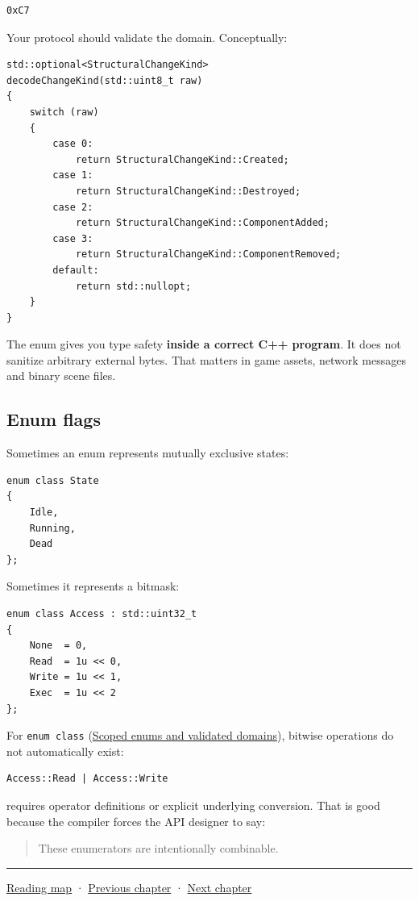\begin{verbatim}
0xC7
\end{verbatim}

Your protocol should validate the domain. Conceptually:

\begin{verbatim}
std::optional<StructuralChangeKind>
decodeChangeKind(std::uint8_t raw)
{
    switch (raw)
    {
        case 0:
            return StructuralChangeKind::Created;
        case 1:
            return StructuralChangeKind::Destroyed;
        case 2:
            return StructuralChangeKind::ComponentAdded;
        case 3:
            return StructuralChangeKind::ComponentRemoved;
        default:
            return std::nullopt;
    }
}
\end{verbatim}

The enum gives you type safety \textbf{inside a correct C++ program}. It does not sanitize arbitrary external bytes. That matters in game assets, network messages and binary scene files.

\subsection{Enum flags}\label{01-foundations-i-ch002-enum-flags}

Sometimes an enum represents mutually exclusive states:

\begin{verbatim}
enum class State
{
    Idle,
    Running,
    Dead
};
\end{verbatim}

Sometimes it represents a bitmask:

\begin{verbatim}
enum class Access : std::uint32_t
{
    None  = 0,
    Read  = 1u << 0,
    Write = 1u << 1,
    Exec  = 1u << 2
};
\end{verbatim}

For \texttt{enum\ class} (\hyperref[appendix-23640fcee147]{Scoped enums and validated domains}), bitwise operations do not automatically exist:

\begin{verbatim}
Access::Read | Access::Write
\end{verbatim}

requires operator definitions or explicit underlying conversion. That is good because the compiler forces the API designer to say:

\begin{quote}
These enumerators are intentionally combinable.
\end{quote}

\begin{center}\rule{0.5\linewidth}{0.5pt}\end{center}

\hyperref[volume-reading-map]{Reading map} · \hyperref[01-foundations-i-ch001]{Previous chapter} · \hyperref[01-foundations-i-ch003]{Next chapter}

